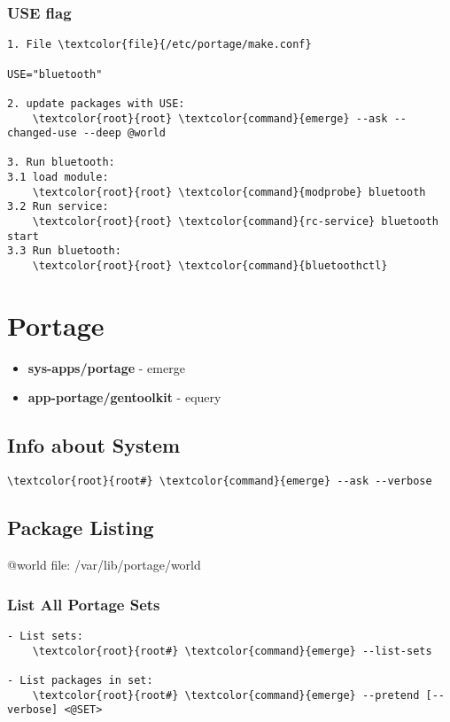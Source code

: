 \documentclass[10pt, a4paper, onecolumn, openany]{book}         %
\begin{document}
\subsection{USE flag}
\begin{Verbatim}[commandchars=\\\{\}]
1. File \textcolor{file}{/etc/portage/make.conf}

USE="bluetooth"

2. update packages with USE:
    \textcolor{root}{root} \textcolor{command}{emerge} --ask --changed-use --deep @world

3. Run bluetooth:
3.1 load module:
    \textcolor{root}{root} \textcolor{command}{modprobe} bluetooth
3.2 Run service:
    \textcolor{root}{root} \textcolor{command}{rc-service} bluetooth start
3.3 Run bluetooth:
    \textcolor{root}{root} \textcolor{command}{bluetoothctl}
\end{Verbatim}






\chapter{Portage}%
\begin{itemize}
    \item \textbf{sys-apps/portage} - emerge
    \item \textbf{app-portage/gentoolkit} - equery
\end{itemize}
\section{Info about System}
\begin{Verbatim}[commandchars=\\\{\}]
    \textcolor{root}{root#} \textcolor{command}{emerge} --ask --verbose
\end{Verbatim}

\section{Package Listing}
@world file: \textcolor{file}{/var/lib/portage/world}
\subsection{List All Portage Sets}
\begin{Verbatim}[commandchars=\\\{\}]
- List sets:
    \textcolor{root}{root#} \textcolor{command}{emerge} --list-sets
    
- List packages in set:
    \textcolor{root}{root#} \textcolor{command}{emerge} --pretend [--verbose] <@SET>
\end{Verbatim}
\end{document}
